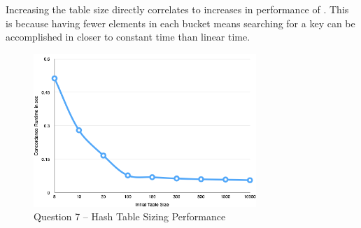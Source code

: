 \documentclass[letter,11pt]{scrartcl}
\begin{document}
Increasing the table size directly correlates to increases in performance of
. This is because having fewer elements in each bucket means
searching for a key can be accomplished in closer to constant time than linear
time.

\begin{figure}[H]
  \centering
  \includegraphics[width=0.75\textwidth]{sizing}
  \caption{Question 7 -- Hash Table Sizing Performance}
\end{figure}

\end{document}
